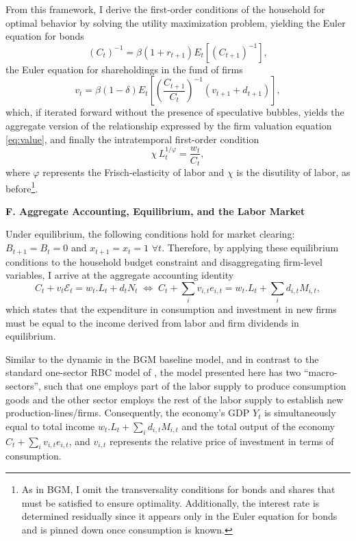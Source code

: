 \documentclass[a4paper,12pt]{article} %
\numberwithin{equation}{section} %
\numberwithin{figure}{section}
\numberwithin{table}{section}
\begin{document}
From this framework, I derive the first-order conditions of the household for optimal behavior by solving the utility maximization problem,
yielding the Euler equation for bonds 
\begin{equation}
(C_t)^{-1} = \beta (1 + r_{t+1}) E_t \left[ (C_{t+1})^{-1} \right], \label{eq:eulerbonds}
\end{equation}
the Euler equation for shareholdings in the fund of firms 
\begin{equation}
v_t = \beta (1 - \delta) E_t \left[ \left( \frac{C_{t+1}}{C_t} \right)^{-1} (v_{t+1} + d_{t+1}) \right], \label{eq:Eulershares}
\end{equation}
which, if iterated forward without the presence of speculative bubbles, yields the aggregate version of the 
relationship expressed by the firm valuation equation \eqref{eq:value}, and finally the intratemporal 
first-order condition 
\begin{equation}
\chi\,L_{t}^{1/\varphi}=\frac{w_t}{C_t}, \label{eq:intratemp}
\end{equation}
where $\varphi$ represents the Frisch-elasticity of labor and $\chi$ is the
disutility of labor, as before\footnote{As in BGM, I omit the transversality conditions for bonds and shares that must be satisfied to
ensure optimality. Additionally, the interest rate is determined residually since it appears only in the Euler equation for bonds and is pinned
down once consumption is known.}.

\medskip
\medskip
\noindent\textbf{F. Aggregate Accounting, Equilibrium, and the Labor Market}
\medskip

Under equilibrium, the following conditions hold for market clearing: $B_{t+1} = B_t=0$ and $x_{t+1}=x_t=1$ $\forall t$. Therefore, by applying these
equilibrium conditions to the household budget constraint and disaggregating firm-level variables, I arrive at the aggregate accounting identity
\begin{equation}
C_t + v_t\mathcal{E}_t= w_t.L_t + d_tN_t \;\Leftrightarrow\;C_t + \sum_iv_{i,t}e_{i,t}= w_t.L_t + \sum_id_{i,t}M_{i,t}, \label{eq:aggaccount}
\end{equation}
which states that the expenditure in consumption and investment in new firms must be equal to the income derived from labor and 
firm dividends in equilibrium.

Similar to the dynamic in the BGM baseline model, and in contrast to the standard one-sector RBC model of \textcite{campbell1994inspecting}, 
the model presented here has two ``macro-sectors'', such that one employs part of the labor supply to produce consumption goods and the other
sector employs the rest of the labor supply to establish new production-lines/firms. Consequently, the economy's GDP $Y_t$ is simultaneously
equal to total income $w_t.L_t + \sum_id_{i,t}M_{i,t}$ and the total output of the economy $C_t + \sum_iv_{i,t}e_{i,t}$, and $v_{i,t}$ represents 
the relative price of investment in terms of consumption.
\end{document}
